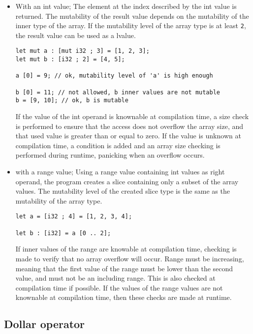 \begin{itemize}
\item With an int value; The element at the index described by the int value is
  returned. The mutability of the result value depends on the mutability of the
  inner type of the array. If the mutability level of the array type is at least
  \texttt{2}, the result value can be used as a lvalue.

  \begin{lstlisting}[style=coloredverbatim]
let mut a : [mut i32 ; 3] = [1, 2, 3];
let mut b : [i32 ; 2] = [4, 5];

a [0] = 9; // ok, mutability level of 'a' is high enough

b [0] = 11; // not allowed, b inner values are not mutable
b = [9, 10]; // ok, b is mutable
  \end{lstlisting}

  If the value of the int operand is knownable at compilation time, a size check
  is performed to ensure that the access does not overflow the array size, and
  that used value is greater than or equal to zero. If the value is unknown at
  compilation time, a condition is added and an array size checking is performed
  during runtime, panicking when an overflow occurs.


\item with a range value; Using a range value containing int values as right
  operand, the program creates a slice containing only a subset of the array
  values. The mutability level of the created slice type is the same as the
  mutability of the array type.

  \begin{lstlisting}[style=coloredverbatim]
let a = [i32 ; 4] = [1, 2, 3, 4];

let b : [i32] = a [0 .. 2];
  \end{lstlisting}

    If inner values of the range are knowable at compilation time, checking is
    made to verify that no array overflow will occur. Range must be increasing,
    meaning that the first value of the range must be lower than the second
    value, and must not be an including range. This is also checked at
    compilation time if possible. If the values of the range values are not
    knownable at compilation time, then these checks are made at runtime.
\end{itemize}

\subsection {Dollar operator}

